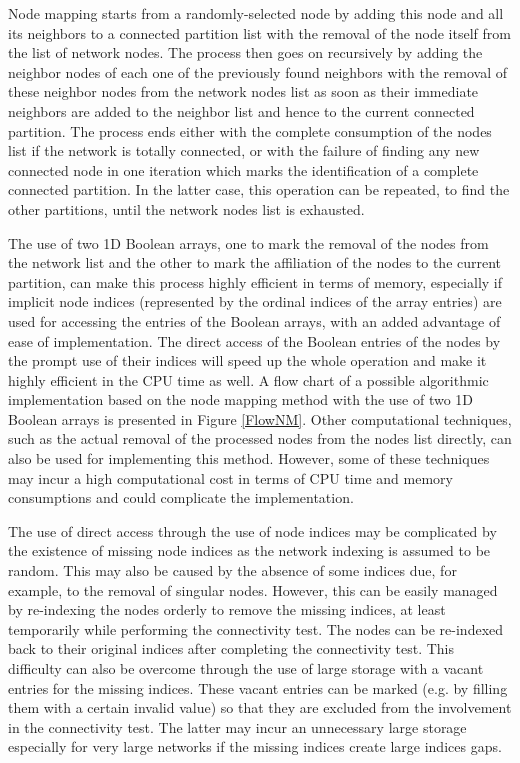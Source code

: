 \documentclass[a4paper,12pt]{article}
\begin{document}
Node mapping starts from a randomly-selected node by adding this node and all its neighbors to a
connected partition list with the removal of the node itself from the list of network nodes. The
process then goes on recursively by adding the neighbor nodes of each one of the previously found
neighbors with the removal of these neighbor nodes from the network nodes list as soon as their
immediate neighbors are added to the neighbor list and hence to the current connected partition.
The process ends either with the complete consumption of the nodes list if the network is totally
connected, or with the failure of finding any new connected node in one iteration which marks the
identification of a complete connected partition. In the latter case, this operation can be
repeated, to find the other partitions, until the network nodes list is exhausted.

The use of two 1D Boolean arrays, one to mark the removal of the nodes from the network list and
the other to mark the affiliation of the nodes to the current partition, can make this process
highly efficient in terms of memory, especially if implicit node indices (represented by the
ordinal indices of the array entries) are used for accessing the entries of the Boolean arrays,
with an added advantage of ease of implementation. The direct access of the Boolean entries of the
nodes by the prompt use of their indices will speed up the whole operation and make it highly
efficient in the CPU time as well. A flow chart of a possible algorithmic implementation based on
the node mapping method with the use of two 1D Boolean arrays is presented in Figure \ref{FlowNM}.
Other computational techniques, such as the actual removal of the processed nodes from the nodes
list directly, can also be used for implementing this method. However, some of these techniques may
incur a high computational cost in terms of CPU time and memory consumptions and could complicate
the implementation.

The use of direct access through the use of node indices may be complicated by the existence of
missing node indices as the network indexing is assumed to be random. This may also be caused by
the absence of some indices due, for example, to the removal of singular nodes. However, this can
be easily managed by re-indexing the nodes orderly to remove the missing indices, at least
temporarily while performing the connectivity test. The nodes can be re-indexed back to their
original indices after completing the connectivity test. This difficulty can also be overcome
through the use of large storage with a vacant entries for the missing indices. These vacant
entries can be marked (e.g. by filling them with a certain invalid value) so that they are excluded
from the involvement in the connectivity test. The latter may incur an unnecessary large storage
especially for very large networks if the missing indices create large indices gaps.
\end{document}
